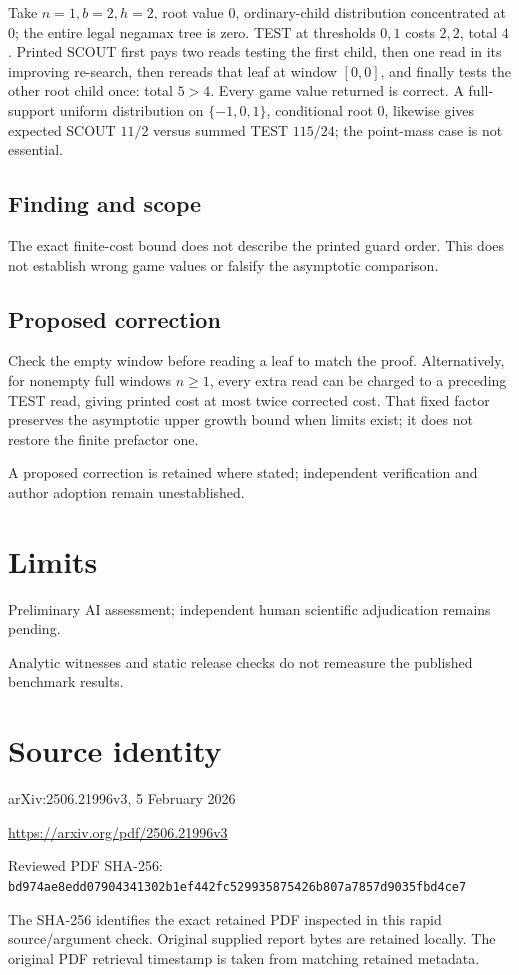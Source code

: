\documentclass[11pt]{article}
\begin{document}
Take \(n=1,b=2,h=2\), root value \(0\), ordinary-child distribution concentrated at \(0\); the entire legal negamax tree is zero. TEST at thresholds \(0,1\) costs \(2,2\), total \(4\). Printed SCOUT first pays two reads testing the first child, then one read in its improving re-search, then rereads that leaf at window \([0,0]\), and finally tests the other root child once: total \(5>4\). Every game value returned is correct. A full-support uniform distribution on \(\{-1,0,1\}\), conditional root \(0\), likewise gives expected SCOUT \(11/2\) versus summed TEST \(115/24\); the point-mass case is not essential.

\subsection*{Finding and scope}

The exact finite-cost bound does not describe the printed guard order. This does not establish wrong game values or falsify the asymptotic comparison.

\subsection*{Proposed correction}

Check the empty window before reading a leaf to match the proof. Alternatively, for nonempty full windows \(n\ge1\), every extra read can be charged to a preceding TEST read, giving printed cost at most twice corrected cost. That fixed factor preserves the asymptotic upper growth bound when limits exist; it does not restore the finite prefactor one.

A proposed correction is retained where stated; independent verification and author adoption remain unestablished.

\section*{Limits}

Preliminary AI assessment; independent human scientific adjudication remains pending.\par

Analytic witnesses and static release checks do not remeasure the published benchmark results.\par

\section*{Source identity}

arXiv:2506.21996v3, 5 February 2026

\url{https://arxiv.org/pdf/2506.21996v3}

Reviewed PDF SHA-256: \nolinkurl{bd974ae8edd07904341302b1ef442fc529935875426b807a7857d9035fbd4ce7}

The SHA-256 identifies the exact retained PDF inspected in this rapid source/argument check. Original supplied report bytes are retained locally. The original PDF retrieval timestamp is taken from matching retained metadata.
\end{document}
